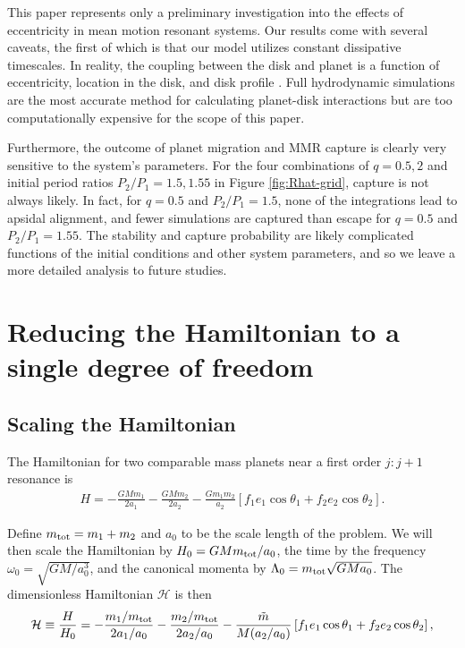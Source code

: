 \documentclass[usenatbib,onecolumn]{mnras}
\begin{document}
This paper represents only a preliminary investigation into the
effects of eccentricity in mean motion resonant systems. Our results
come with several caveats, the first of which is that our model
utilizes constant dissipative timescales. In reality, the coupling
between the disk and planet is a function of eccentricity, location in
the disk, and disk profile
\citep{cresswell_evolution_2006,cresswell_three-dimensional_2008}.  Full
hydrodynamic simulations are the most accurate method for calculating
planet-disk interactions but are too computationally expensive for the
scope of this paper.

Furthermore, the outcome of planet migration and MMR capture is
clearly very sensitive to the system's parameters.  For the four
combinations of \(q=0.5,2\) and initial period ratios \(P_2/P_1=1.5,1.55\)
in Figure \ref{fig:Rhat-grid}, capture is not always likely. In fact,
for \(q=0.5\) and \(P_2/P_1=1.5\), none of the integrations lead to
apsidal alignment, and fewer simulations are captured than escape for
\(q=0.5\) and \(P_2/P_1=1.55\).  The stability and capture probability are
likely complicated functions of the initial conditions and other
system parameters, and so we leave a more detailed analysis to future
studies.


\clearpage
\onecolumn
\appendix
\section{Reducing the Hamiltonian to a single degree of freedom}
\label{sec:orgf6863c3}
\subsection{Scaling the Hamiltonian}
\label{sec:org0ab736e}
The Hamiltonian for two comparable mass planets near a first order \(j:j+1\)
resonance is
\begin{align}
  H = -\frac{G M m_{1}}{2 a_{1}}-\frac{G M m_{2}}{2 a_{2}}
                 -\frac{G m_{1} m_{2}}{a_{2}}
                  \left[
                  f_{1} e_{1} \cos \theta_{1} 
                  +f_{2} e_{2} \cos \theta_{2}\right].
\end{align}

\noindent Define \(m_{\rm tot} = m_1+m_2\) and \(a_0\) to be the
scale length of the problem.  We will then scale the Hamiltonian by
\(H_0 = GMm_{\rm tot}/a_0\), the time by the frequency \(\omega_0 =
\sqrt{GM/a_0^3}\), and the canonical momenta by \(\Lambda_0 = m_{\rm
tot} \sqrt{GMa_0}\).  The dimensionless Hamiltonian \(\mathcal{H}\) is
then
\begin{align}
  \mathcal{H} \equiv \frac{H}{H_0}
  = -\frac{m_1/m_{\rm tot}}{2a_1/a_0}
    -\frac{m_2/m_{\rm tot}}{2a_2/a_0}
  -\frac{\tilde m}{M (a_2/a_0)}\left[
    f_1e_1\cos\theta_1+f_2e_2\cos\theta_2
    \right],
\end{align}
\end{document}
